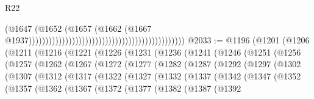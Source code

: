 \begin{lexlean}{R22}
\begin{coremodule}
                                                                                        (@1647
                                                                                          (@1652
                                                                                            (@1657
                                                                                              (@1662
                                                                                                (@1667
                                                                                                  @1937)))))))))))))))))))))))))))))))))))))))))))))))
@2033 := @1196
    (@1201
      (@1206
        (@1211
          (@1216
            (@1221
              (@1226
                (@1231
                  (@1236
                    (@1241
                      (@1246
                        (@1251
                          (@1256
                            (@1257
                              (@1262
                                (@1267
                                  (@1272
                                    (@1277
                                      (@1282
                                        (@1287
                                          (@1292
                                            (@1297
                                              (@1302
                                                (@1307
                                                  (@1312
                                                    (@1317
                                                      (@1322
                                                        (@1327
                                                          (@1332
                                                            (@1337
                                                              (@1342
                                                                (@1347
                                                                  (@1352
                                                                    (@1357
                                                                      (@1362
                                                                        (@1367
                                                                          (@1372
                                                                            (@1377
                                                                              (@1382
                                                                                (@1387
                                                                                  (@1392

\end{coremodule}
\end{lexlean}
